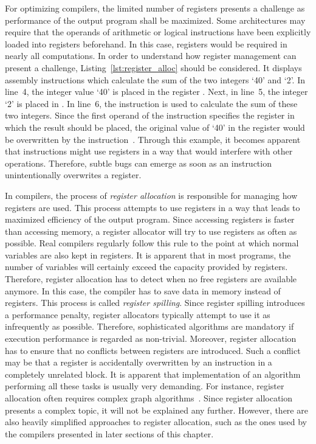 For optimizing compilers, the limited number of registers presents a challenge as performance of the output program shall be maximized.
Some architectures may require that the operands of arithmetic or logical instructions have been explicitly loaded into registers beforehand.
In this case, registers would be required in nearly all computations.
In order to understand how register management can present a challenge, Listing~\ref{lst:register_alloc} should be considered.
It displays \riscv{} assembly instructions which calculate the sum of the two integers `40' and `2'.
In line~4, the integer value `40' is placed in the register .
Next, in line~5, the integer `2' is placed in .
In line~6, the  instruction is used to calculate the sum of these two integers.
Since the first operand of the instruction specifies the register in which the result should be placed,
the original value of `40' in the register  would be overwritten by the instruction~\cite[Reference Card]{Patterson2017}.
Through this example, it becomes apparent that instructions might use registers in a way that would interfere with other operations.
Therefore, subtle bugs can emerge as soon as an instruction unintentionally overwrites a register.

In compilers, the process of \emph{register allocation} is responsible for managing how registers are used.
This process attempts to use registers in a way that leads to maximized efficiency of the output program.
Since accessing registers is faster than accessing memory, a register allocator will try to use registers as often as possible.
Real compilers regularly follow this%
%
%
rule to the point at which normal variables are also kept in registers.
It is apparent that in most programs, the number of variables will certainly exceed the capacity provided by registers.
Therefore, register allocation has to detect when no free registers are available anymore.
In this case, the compiler has to save data in memory instead of registers.
This process is called \emph{register spilling}.
Since register spilling introduces a performance penalty, register allocators typically attempt to use it as infrequently as possible.
Therefore, sophisticated algorithms are mandatory if execution performance is regarded as non-trivial.
Moreover, register allocation has to ensure that no conflicts between registers are introduced.
Such a conflict may be that a register is accidentally overwritten by an instruction in a completely unrelated block.
It is apparent that implementation of an algorithm performing all these tasks is usually very demanding.
For instance, register allocation often requires complex graph algorithms~\cite[pp.212-214]{Watson2017}.
Since register allocation presents a complex topic, it will not be explained any further.
However, there are also heavily simplified approaches to register allocation,
such as the ones used by the compilers presented in later sections of this chapter.

